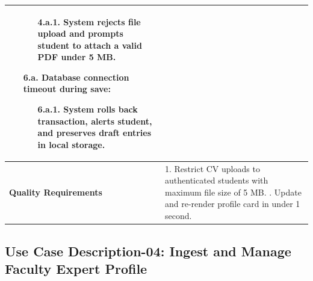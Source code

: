 \begin{table}[H]
\begin{tabularx}{\textwidth}{|l|X|}
\begin{itemize}[leftmargin=*]
    \begin{itemize}[leftmargin=*]
        \item[4.a.1.] System rejects file upload and prompts student to attach a valid PDF under 5 MB.
    \end{itemize}
    \item[\textbf{6.a.}] \textbf{Database connection timeout during save:}
    \begin{itemize}[leftmargin=*]
        \item[6.a.1.] System rolls back transaction, alerts student, and preserves draft entries in local storage.
    \end{itemize}
\end{itemize} \\ \hline
\textbf{Quality Requirements} & 
1. Restrict CV uploads to authenticated students with maximum file size of 5 MB. \newline
2. Update and re-render profile card in under 1 second. \\ \hline
\end{tabularx}
\end{table}

\clearpage
\subsection{Use Case Description-04: Ingest and Manage Faculty Expert Profile}
\label{subsec:uc04}

